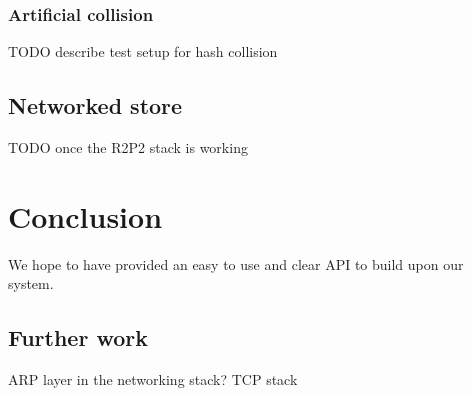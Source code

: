 \documentclass[11pt]{article}
\begin{document}
\subsubsection{Artificial collision}

TODO describe test setup for hash collision

\subsection{Networked store}

TODO once the R2P2 stack is working

\section{Conclusion}

We hope to have provided an easy to use and clear API to build upon
our system.


\subsection{Further work}
ARP layer in the networking stack?
TCP stack
\end{document}
